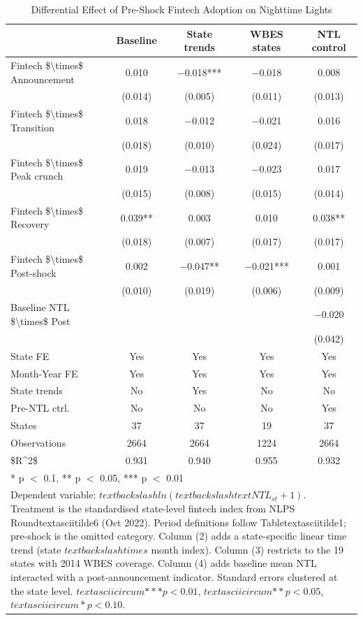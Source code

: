 \begin{table}
\centering
\caption{Differential Effect of Pre-Shock Fintech Adoption on Nighttime Lights}
\centering
\begin{tabular}[t]{lcccc}
\toprule
  & Baseline & State trends & WBES states & NTL control\\
\midrule
Fintech \$\textbackslash{}times\$ Announcement & \num{0.010} & \num{-0.018}*** & \num{-0.018} & \num{0.008}\\
 & (\num{0.014}) & (\num{0.005}) & (\num{0.011}) & (\num{0.013})\\
Fintech \$\textbackslash{}times\$ Transition & \num{0.018} & \num{-0.012} & \num{-0.021} & \num{0.016}\\
 & (\num{0.018}) & (\num{0.010}) & (\num{0.024}) & (\num{0.017})\\
Fintech \$\textbackslash{}times\$ Peak crunch & \num{0.019} & \num{-0.013} & \num{-0.023} & \num{0.017}\\
 & (\num{0.015}) & (\num{0.008}) & (\num{0.015}) & (\num{0.014})\\
Fintech \$\textbackslash{}times\$ Recovery & \num{0.039}** & \num{0.003} & \num{0.010} & \num{0.038}**\\
 & (\num{0.018}) & (\num{0.007}) & (\num{0.017}) & (\num{0.017})\\
Fintech \$\textbackslash{}times\$ Post-shock & \num{0.002} & \num{-0.047}** & \num{-0.021}*** & \num{0.001}\\
 & (\num{0.010}) & (\num{0.019}) & (\num{0.006}) & (\num{0.009})\\
Baseline NTL \$\textbackslash{}times\$ Post &  &  &  & \num{-0.020}\\
 &  &  &  & (\num{0.042})\\
\midrule
State FE & Yes & Yes & Yes & Yes\\
Month-Year FE & Yes & Yes & Yes & Yes\\
State trends & No & Yes & No & No\\
Pre-NTL ctrl. & No & No & No & Yes\\
States & 37 & 37 & 19 & 37\\
Observations & \num{2664} & \num{2664} & \num{1224} & \num{2664}\\
\$R\textasciicircum{}2\$ & \num{0.931} & \num{0.940} & \num{0.955} & \num{0.932}\\
\bottomrule
\multicolumn{5}{l}{\rule{0pt}{1em}* p $<$ 0.1, ** p $<$ 0.05, *** p $<$ 0.01}\\
\multicolumn{5}{l}{\rule{0pt}{1em}Dependent variable: $textbackslash{}ln(textbackslash{}text{NTL}_{st}+1)$. Treatment is the standardised state-level fintech index from NLPS Roundtextasciitilde{}6 (Oct 2022). Period definitions follow Tabletextasciitilde{}1; pre-shock is the omitted category. Column (2) adds a state-specific linear time trend (state $textbackslash{}times$ month index). Column (3) restricts to the 19 states with 2014 WBES coverage. Column (4) adds baseline mean NTL interacted with a post-announcement indicator. Standard errors clustered at the state level. $textasciicircum{}{***}p<0.01$, $textasciicircum{}{**}p<0.05$, $textasciicircum{}{*}p<0.10$.}\\
\end{tabular}
\end{table}
